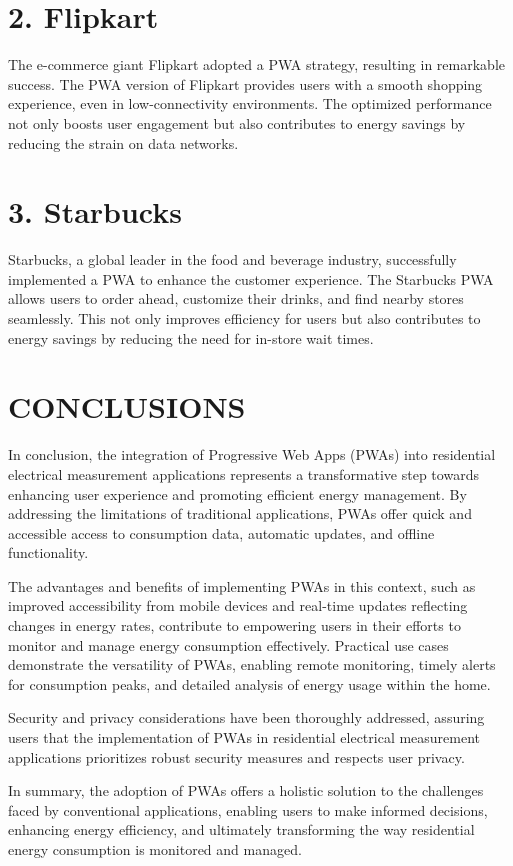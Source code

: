 \documentclass{article}
\begin{document}
\begin{multicols}{2}
\section*{2. Flipkart}

The e-commerce giant Flipkart adopted a PWA strategy, resulting in remarkable success. The PWA version of Flipkart provides users with a smooth shopping experience, even in low-connectivity environments. The optimized performance not only boosts user engagement but also contributes to energy savings by reducing the strain on data networks.
\citep*{PWAcaring}
\section*{3. Starbucks}

Starbucks, a global leader in the food and beverage industry, successfully implemented a PWA to enhance the customer experience. The Starbucks PWA allows users to order ahead, customize their drinks, and find nearby stores seamlessly. This not only improves efficiency for users but also contributes to energy savings by reducing the need for in-store wait times.
\citep{StarbucksPWA}


\section*{CONCLUSIONS}
In conclusion, the integration of Progressive Web Apps (PWAs) into residential electrical measurement applications represents a transformative step towards enhancing user experience and promoting efficient energy management. By addressing the limitations of traditional applications, PWAs offer quick and accessible access to consumption data, automatic updates, and offline functionality.



The advantages and benefits of implementing PWAs in this context, such as improved accessibility from mobile devices and real-time updates reflecting changes in energy rates, contribute to empowering users in their efforts to monitor and manage energy consumption effectively. Practical use cases demonstrate the versatility of PWAs, enabling remote monitoring, timely alerts for consumption peaks, and detailed analysis of energy usage within the home.



Security and privacy considerations have been thoroughly addressed, assuring users that the implementation of PWAs in residential electrical measurement applications prioritizes robust security measures and respects user privacy.



In summary, the adoption of PWAs offers a holistic solution to the challenges faced by conventional applications, enabling users to make informed decisions, enhancing energy efficiency, and ultimately transforming the way residential energy consumption is monitored and managed.

   
     
\end{multicols}  %
\end{document}
